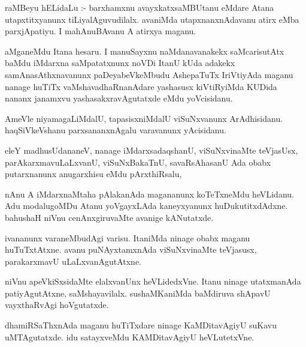\documentclass{article}
\begin{document}


\begin{mn}
raMBeyu  hELidaLu :- barxhamxnu avayxkatxsaMBUtanu eMdare Atana utapxtitxyanunx  tiLiyalAguvudilalx.  
avaniMda utapxnanxnAdavanu atirx eMba parxjApatiyu.  I mahAnuBAvanu A atirxya maganu.
\end{mn}

\begin{mn}
aMganeMdu  Itana hesaru.  I manuSayxnu  naMdanavanakekx  saMcarisutAtx baMdu iMdarxna 
saMpatatxnunx  noVDi ItanU kUda adakekx samAnasAthxnavanunx paDeyabeVkeMbudu AshepaTuTx  
IriVtiyAda maganu nanage huTiTx vaMshavadhaRnanAdare yashasusx kiVtiRyiMda KUDida 
nananx janamxvu yashasakxravAgutatxde eMdu yoVcisidanu.
\end{mn}

\begin{mn}
AmeVle niyamagaLiMdalU, tapasisxniMdalU  viSuNxvanunx ArAdhisidanu.  haqSiVkeVshanu 
parxsananxnAgalu varavanunx yAcisidanu.
\end{mn}

\begin{mn}
eleY madhusUdananeV,  nanage  iMdarxsadaqshanU, viSuNxvinaMte teVjasUsx, parAkarxmavuLaLxvanU,  
viSuNxBakaTnU, savaRsAhasanU Ada obabx putarxnanunx anugarxhisu eMdu pArxthiRsalu,
\end{mn}

\begin{mn}
nAnu A iMdarxnaMtaha pAlakanAda magananunx koTeTxneMdu heVLidanu.  Adu modalugoMDu Atanu 
yoVgayxLAda kaneyxyanunx huDukutitxdAdxne.  bahushaH niVnu cenAnxgiruvaMte avanige kANutatxde.
\end{mn}

\begin{mn}
ivananunx varaneMbudAgi  varisu.  ItaniMda ninage obabx maganu huTuTxtAtxne.  
avanu puNAyxtamxnAda viSuNxvinaMte teVjasusx, parakarxmavU uLaLxvanAgutAtxne.
\end{mn}

\begin{mn}
niVnu apeVkiSxsidaMte elalxvanUnx  heVLidedxVne.  Itanu ninage utatxmanAda 
patiyAgutAtxne, saMshayavilalx. sushaMKaniMda baMdiruva shApavU vayxthaRvAgi hoVgutatxde.
\end{mn}

\begin{mn}
dhamiRSaThxnAda maganu huTiTxdare ninage KaMDitavAgiyU suKavu uMTAgutatxde.  
idu satayxveMdu KAMDitavAgiyU heVLutetxVne.
\end{mn}
\end{document}
